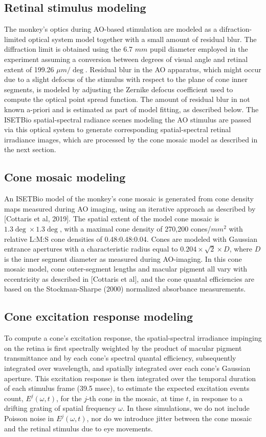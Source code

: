 \documentclass[11pt, oneside]{article}   	%
\begin{document}
\subsection{Retinal stimulus modeling}
The monkey's optics during AO-based stimulation are modeled as a difraction-limited optical system model together with a small amount of residual blur. The diffraction limit is obtained using the 6.7 $mm$ pupil diameter employed in the experiment assuming a conversion between degrees of visual angle and retinal extent of 199.26 $\mu m / \deg$. Residual blur in the AO apparatus, which might occur due to a slight defocus of the stimulus with respect to the plane of cone inner segments, is modeled by adjusting the Zernike defocus coefficient used to compute the optical point spread function. The amount of residual blur in not known a-priori and is estimated as part of model fitting, as described below. The ISETBio spatial-spectral radiance scenes modeling the AO stimulus are passed via this optical system to generate corresponding spatial-spectral retinal irradiance images, which are processed by the cone mosaic model as described in the next section.

\subsection{Cone mosaic modeling}
An ISETBio model of the monkey's cone mosaic is generated from cone density maps measured during AO imaging, using an iterative approach as described by [Cottaris et al, 2019]. The spatial extent of the model cone mosaic is $1.3 \deg \times 1.3 \deg$, with a maximal cone density of 270,200 cones/$mm^2$ with relative L:M:S cone densities of 0.48:0.48:0.04. Cones are modeled with Gaussian entrance apertures with a characteristic radius equal to $0.204 \times \sqrt{2} \times D$, where $D$ is the inner segment diameter as measured during AO-imaging. In this cone mosaic model, cone outer-segment lengths and macular pigment all vary with eccentricity as described in [Cottaris et al], and the cone quantal efficiencies are based on the Stockman-Sharpe (2000) normalized absorbance measurements. 

\subsection{Cone excitation response modeling}
To compute a cone's excitation response, the spatial-spectral irradiance impinging on the retina is first spectrally weighted by the product of macular pigment transmittance and by each cone's spectral quantal efficiency, subsequently integrated over wavelength, and spatially integrated over each cone's Gaussian aperture. This excitation response is then integrated over the temporal duration of each stimulus frame (39.5 msec), to estimate the expected excitation events count, $E^j(\omega,t)$, for the $j$-th cone in the mosaic, at time $t$, in response to a drifting grating of spatial frequency $\omega$. In these simulations, we do not include Poisson noise in $E^j(\omega,t)$, nor do we introduce jitter between the cone mosaic and the retinal stimulus due to eye movements.
\end{document}
